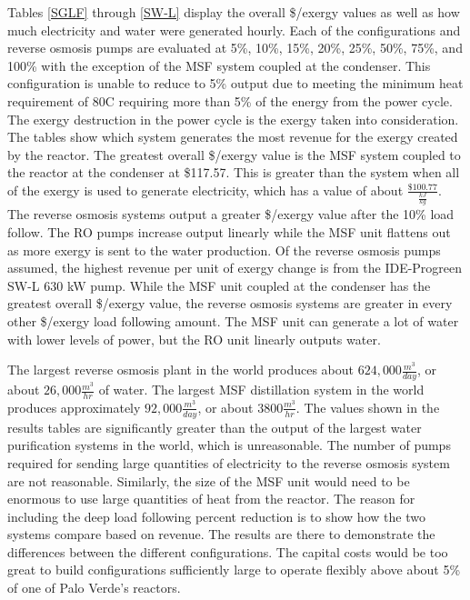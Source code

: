 Tables \ref{SGLF} through \ref{SW-L} display the overall \$/exergy values as well as how much electricity and water were generated hourly.  Each of the configurations and reverse osmosis pumps are evaluated at 5\%, 10\%, 15\%, 20\%, 25\%, 50\%, 75\%, and 100\% with the exception of the MSF system coupled at the condenser.  This configuration is unable to reduce to 5\% output due to meeting the minimum heat requirement of 80\degree C requiring more than 5\% of the energy from the power cycle. The exergy destruction in the power cycle is the exergy taken into consideration.  The tables show which system generates the most revenue for the exergy created by the reactor. The greatest overall \$/exergy value is the MSF system coupled to the reactor at the condenser at \$117.57.  This is greater than the system when all of the exergy is used to generate electricity, which has a value of about $\frac{\$100.77}{\frac{kJ}{kg}}$. The reverse osmosis systems output a greater \$/exergy value after the 10\% load follow.  The RO pumps increase output linearly while the MSF unit flattens out as more exergy is sent to the water production. Of the reverse osmosis pumps assumed, the highest revenue per unit of exergy change is from the IDE-Progreen SW-L 630 kW pump.  While the MSF unit coupled at the condenser has the greatest overall \$/exergy value, the reverse osmosis systems are greater in every other \$/exergy load following amount.  The MSF unit can generate a lot of water with lower levels of power, but the RO unit linearly outputs water.

The largest reverse osmosis plant in the world produces about $624,000 \frac{m^3}{day}$, or about $26,000\frac{m^3}{hr}$ of water. The largest MSF distillation system in the world produces approximately $92,000\frac{m^3}{day}$, or about $3800\frac{m^3}{hr}$.  The values shown in the results tables are significantly greater than the output of the largest water purification systems in the world, which is unreasonable. The number of pumps required for sending large quantities of electricity to the reverse osmosis system are not reasonable. Similarly, the size of the MSF unit would need to be enormous to use large quantities of heat from the reactor.  The reason for including the deep load following percent reduction is to show how the two systems compare based on revenue. The results are there to demonstrate the differences between the different configurations. The capital costs would be too great to build configurations sufficiently large to operate flexibly above about 5\% of one of Palo Verde's reactors.

